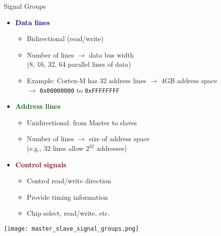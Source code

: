 \begin{theorem}{Signal Groups}
    \begin{itemize}
        \item \textcolor{darkblue}{\textbf{Data lines}}
        \begin{itemize}
            \item Bidirectional (read/write)
            \item Number of lines $\rightarrow$ data bus width \\(8, 16, 32, 64 parallel lines of data)
            \item Example: Cortex-M has 32 address lines $\rightarrow$ 4GB address space \\ $\rightarrow$ \texttt{0x00000000} to \texttt{0xFFFFFFFF}
        \end{itemize}
        \item \textcolor{darkgreen}{\textbf{Address lines}}
        \begin{itemize}
            \item Unidirectional: from Master to slaves
            \item Number of lines $\rightarrow$ size of address space \\ (e.g., 32 lines allow $2^{32}$ addresses)
        \end{itemize}
        \item \textcolor{darkred}{\textbf{Control signals}}
        \begin{itemize}
            \item Control read/write direction
            \item Provide timing information
            \item Chip select, read/write, etc.
        \end{itemize}
    \end{itemize}
    \vspace{2mm}
    \texttt{[image: master\_slave\_signal\_groups.png]}
\end{theorem}

